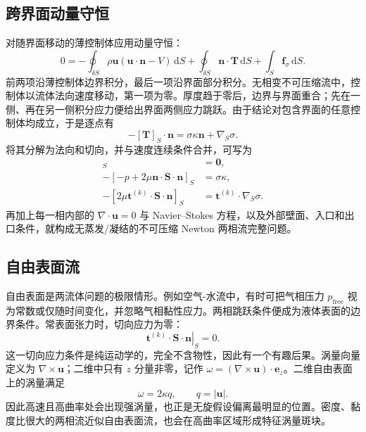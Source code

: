 \documentclass[11pt,a4paper,openany,fontset=none]{ctexbook}
\begin{document}
\subsection{跨界面动量守恒}


对随界面移动的薄控制体应用动量守恒：
\begin{equation}
 0=-\oint_{\delta S}\rho\bm u(\bm u\cdot\bm n-V)\,\mathrm dS
 +\oint_{\delta S}\bm n\cdot\bm T\,\mathrm dS
 +\int_S\bm f_\sigma\,\mathrm dS. \tag{2.56}
\end{equation}
前两项沿薄控制体边界积分，最后一项沿界面部分积分。无相变不可压缩流中，控制体以流体法向速度移动，第一项为零。厚度趋于零后，边界与界面重合；先在一侧、再在另一侧积分应力便给出界面两侧应力跳跃。由于结论对包含界面的任意控制体均成立，于是逐点有
\begin{equation}
 -[\bm T]_S\cdot\bm n=\sigma\kappa\bm n+\nabla_S\sigma. \tag{2.57}
\end{equation}
将其分解为法向和切向，并与速度连续条件合并，可写为
\begin{align}
 [\bm u]_S&=\bm0,\\
 -[-p+2\mu\bm n\cdot\bm S\cdot\bm n]_S&=\sigma\kappa,\\
 -[2\mu\bm t^{(k)}\cdot\bm S\cdot\bm n]_S&=\bm t^{(k)}\cdot\nabla_S\sigma. \tag{2.57a--c}
\end{align}
再加上每一相内部的 $\nabla\cdot\bm u=0$ 与 Navier--Stokes 方程，以及外部壁面、入口和出口条件，就构成无蒸发/凝结的不可压缩 Newton 两相流完整问题。

\subsection{自由表面流}


自由表面是两流体问题的极限情形。例如空气-水流中，有时可把气相压力 $p_{\mathrm{free}}$ 视为常数或仅随时间变化，并忽略气相黏性应力。两相跳跃条件便成为液体表面的边界条件。常表面张力时，切向应力为零：
\begin{equation}
 \left.\bm t^{(k)}\cdot\bm S\cdot\bm n\right|_S=0. \tag{2.58}
\end{equation}
这一切向应力条件是纯运动学的，完全不含物性，因此有一个有趣后果。涡量向量定义为 $\nabla\times\bm u$；二维中只有 $z$ 分量非零，记作 $\omega=(\nabla\times\bm u)\cdot\bm e_z$。二维自由表面上的涡量满足
\begin{equation}
 \omega=2\kappa q,\qquad q=|\bm u|. \tag{2.59}
\end{equation}
因此高速且高曲率处会出现强涡量，也正是无旋假设偏离最明显的位置。密度、黏度比很大的两相流近似自由表面流，也会在高曲率区域形成特征涡量斑块。
\end{document}
